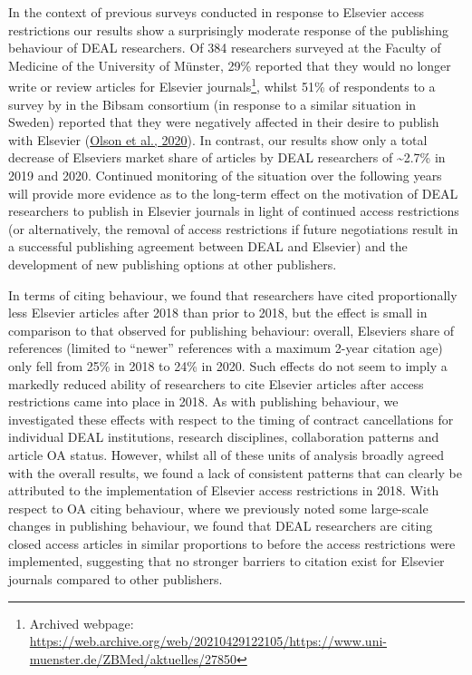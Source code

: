 \documentclass[
]{article}
\begin{document}
In the context of previous surveys conducted in response to Elsevier access restrictions our results show a surprisingly moderate response of the publishing behaviour of DEAL researchers. Of 384 researchers surveyed at the Faculty of Medicine of the University of Münster, 29\% reported that they would no longer write or review articles for Elsevier journals\footnote{Archived webpage: \url{https://web.archive.org/web/20210429122105/https://www.uni-muenster.de/ZBMed/aktuelles/27850}}, whilst 51\% of respondents to a survey by in the Bibsam consortium (in response to a similar situation in Sweden) reported that they were negatively affected in their desire to publish with Elsevier (\href{http://doi.org/10.1629/uksg.507}{Olson et al., 2020}). In contrast, our results show only a total decrease of Elsevier\textquotesingle s market share of articles by DEAL researchers of \textasciitilde2.7\% in 2019 and 2020. Continued monitoring of the situation over the following years will provide more evidence as to the long-term effect on the motivation of DEAL researchers to publish in Elsevier journals in light of continued access restrictions (or alternatively, the removal of access restrictions if future negotiations result in a successful publishing agreement between DEAL and Elsevier) and the development of new publishing options at other publishers.

In terms of citing behaviour, we found that researchers have cited proportionally less Elsevier articles after 2018 than prior to 2018, but the effect is small in comparison to that observed for publishing behaviour: overall, Elsevier\textquotesingle s share of references (limited to ``newer'' references with a maximum 2-year citation age) only fell from 25\% in 2018 to 24\% in 2020. Such effects do not seem to imply a markedly reduced ability of researchers to cite Elsevier articles after access restrictions came into place in 2018. As with publishing behaviour, we investigated these effects with respect to the timing of contract cancellations for individual DEAL institutions, research disciplines, collaboration patterns and article OA status. However, whilst all of these units of analysis broadly agreed with the overall results, we found a lack of consistent patterns that can clearly be attributed to the implementation of Elsevier access restrictions in 2018. With respect to OA citing behaviour, where we previously noted some large-scale changes in publishing behaviour, we found that DEAL researchers are citing closed access articles in similar proportions to before the access restrictions were implemented, suggesting that no stronger barriers to citation exist for Elsevier journals compared to other publishers.
\end{document}

